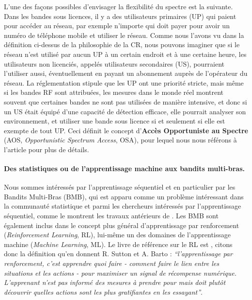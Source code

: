 \begin{resume_fr}
L'une des façons possibles d'envisager la flexibilité du spectre est la suivante.
%
Dans les bandes sous licences, il y a des utilisateurs primaires (UP) qui paient pour accéder au réseau, par exemple n'importe qui doit payer pour avoir un numéro de téléphone mobile et utiliser le réseau.
Comme nous l'avons vu dans la définition ci-dessus de la philosophie de la CR, nous pouvons imaginer que si le réseau n'est utilisé par aucun UP à un certain endroit et à une certaine heure, les utilisateurs non licenciés, appelés utilisateurs secondaires (US), pourraient l'utiliser aussi, éventuellement en payant un abonnement auprès de l'opérateur du réseau.
%
La réglementation stipule que les UP ont une priorité stricte,
mais même si les bandes RF sont attribuées, les mesures dans le monde réel montrent souvent que certaines bandes ne sont pas utilisées de manière intensive, et donc si un US était équipé d'une capacité de détection efficace, elle pourrait analyser son environnement, et utiliser une bande sous licence si et seulement si elle est exempte de tout UP.
Ceci définit le concept d'\textbf{Accès Opportuniste au Spectre} (AOS, \emph{Opportunistic Spectrum Access}, OSA), pour lequel nous nous référons à l'article \cite{Zhao07} pour plus de détails.


\paragraph{Des statistiques ou de l'apprentissage machine aux bandits multi-bras.}
%
Nous sommes intéressés par l'apprentissage séquentiel et en particulier par les Bandits Multi-Bras (BMB),
qui est apparu comme un problème intéressant dans la communauté statistique et parmi les chercheurs intéressés par l'apprentissage séquentiel, comme le montrent les travaux antérieurs de \cite{Thompson33,Robbins52,LaiRobbins85}.
Les BMB sont également inclus dans le concept plus général d'apprentissage par renforcement (\emph{Reinforcement Learning}, RL), lui-même un des domaines de l'apprentissage machine (\emph{Machine Learning}, ML).
%
Le livre de référence sur le RL est \cite{SuttonBarto2018}, citons donc la définition qu'en donnent R. Sutton et A. Barto :
\emph{``l'apprentissage par renforcement, c'est apprendre quoi faire - comment faire le lien entre les situations et les actions -
pour maximiser un signal de récompense numérique. L'apprenant n'est pas informé des mesures à prendre pour
mais doit plutôt découvrir quelles actions sont les plus gratifiantes en les essayant''}.



\end{resume_fr}
